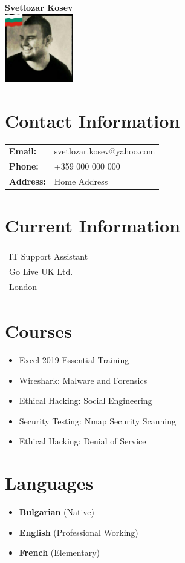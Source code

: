 \documentclass[letterpaper,6pt]{article}
\begin{document}
	
	\begin{minipage}[t]{0.4\textwidth}
		\begin{center}
			\Large\textbf{Svetlozar Kosev}\\[2ex]
			\includegraphics[width=3cm,height=3cm]{your_photo.jpg} %
		\end{center}
		
		\section*{Contact Information}
		\begin{tabular}{@{}l l}
			\textbf{Email:} & svetlozar.kosev@yahoo.com \\
			\textbf{Phone:} & +359 000 000 000 \\
			\textbf{Address:} & Home Address \\
		\end{tabular}
		
		\section*{Current Information}
		\begin{tabular}{@{}l}
			IT Support Assistant \\
			Go Live UK Ltd. \\
			London \\
		\end{tabular}
		
		\section*{Courses}
		\begin{itemize}
			\item Excel 2019 Essential Training
			\item Wireshark: Malware and Forensics
			\item Ethical Hacking: Social Engineering
			\item Security Testing: Nmap Security Scanning
			\item Ethical Hacking: Denial of Service
		\end{itemize}
		
		\section*{Languages}
		\begin{itemize}
			\item \textbf{Bulgarian} (Native)
			\item \textbf{English} (Professional Working)
			\item \textbf{French} (Elementary)
		\end{itemize}
	\end{minipage}
\end{document}
